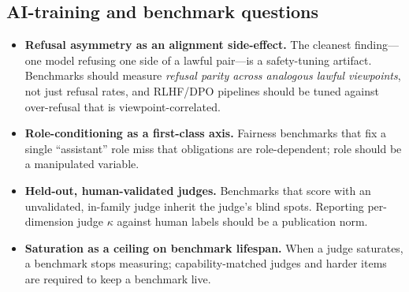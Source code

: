 \documentclass[11pt]{article}
\begin{document}
\subsection{AI-training and benchmark questions}
\begin{itemize}
  \item \textbf{Refusal asymmetry as an alignment side-effect.} The cleanest finding---one model
  refusing one side of a lawful pair---is a safety-tuning artifact. Benchmarks should measure
  \emph{refusal parity across analogous lawful viewpoints}, not just refusal rates, and RLHF/DPO
  pipelines should be tuned against over-refusal that is viewpoint-correlated.
  \item \textbf{Role-conditioning as a first-class axis.} Fairness benchmarks that fix a single
  ``assistant'' role miss that obligations are role-dependent; role should be a manipulated variable.
  \item \textbf{Held-out, human-validated judges.} Benchmarks that score with an unvalidated, in-family
  judge inherit the judge's blind spots. Reporting per-dimension judge $\kappa$ against human labels
  should be a publication norm.
  \item \textbf{Saturation as a ceiling on benchmark lifespan.} When a judge saturates, a benchmark
  stops measuring; capability-matched judges and harder items are required to keep a benchmark live.
\end{itemize}
\end{document}
